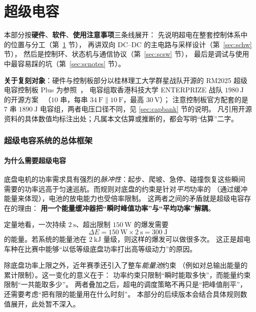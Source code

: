 \documentclass[cn,blue,11pt,device=normal]{elegantnote}
\begin{document}
\part{超级电容}

\begin{note}
本部分按\textbf{硬件}、\textbf{软件}、\textbf{使用注意事项}三条线展开：
先说明超电在整套控制体系中的位置与分工（第~\ref{sec:supercap} 节），
再讲双向 DC--DC 的主电路与采样设计（第~\ref{sec:schw} 节），
然后是控制环、状态机与通信协议（第~\ref{sec:scsw} 节），
最后是调试与使用中最容易踩的坑（第~\ref{sec:scnotes} 节）。

\textbf{关于复刻对象}：硬件与控制板部分以桂林理工大学群星战队开源的
RM2025 超级电容控制板 Plus 为参照~\cite{glutplushw,glutplusmanual,glutcubemx,glutmaintain}，
电容组取香港科技大学 ENTERPRIZE 战队 $1980\ \mathrm{J}$ 的开源方案~\cite{hkust1980j}
（$10$ 串，每串 $34\ \mathrm{F}\parallel10\ \mathrm{F}$，最高 $30\ \mathrm{V}$）；
注意控制板官方配套的是 $7$ 串 $1890\ \mathrm{J}$ 电容组，两者电压口径不同，见 \ref{sec:capbank} 节的说明。
凡引用开源资料的具体数值均标注出处；凡属本文估算或推断的，都会写明“估算”二字。
\end{note}

\section{超级电容系统的总体框架}\label{sec:supercap}

\subsection{为什么需要超级电容}

底盘电机的功率需求具有强烈的\emph{脉冲性}：起步、爬坡、急停、碰撞恢复这些瞬间
需要的功率远高于匀速巡航。而规则对底盘的约束是针对\emph{平均}功率的
（通过缓冲能量来体现），电池的放电能力也受倍率限制。
这两者之间的矛盾就是超级电容存在的理由：
\textbf{用一个能量缓冲器把“瞬时峰值功率”与“平均功率”解耦}。

定量地看，一次持续 $2\ \mathrm{s}$、超出限制 $150\ \mathrm{W}$ 的爆发需要
\begin{equation}
  \Delta E = 150\ \mathrm{W}\times 2\ \mathrm{s} = 300\ \mathrm{J}
\end{equation}
的能量。若系统的能量池在 $2\ \mathrm{kJ}$ 量级，则这样的爆发可以做很多次。
这正是超电车种在比赛中能够“以低等级底盘功率打出高等级动力”的原因。

\begin{note}[与规则的关系]
除底盘功率上限之外，近年赛季还引入了整车\emph{能量池}约束
（例如对总输出能量的累计限制）。这一变化的意义在于：
功率约束只限制“瞬时能取多快”，而能量约束限制“一共能取多少”。
两者叠加之后，超电的调度策略不再只是“把峰值削平”，
还需要考虑“把有限的能量用在什么时刻”。
本部分的后续版本会结合具体规则数值展开，此处暂不深入。
\end{note}
\end{document}
